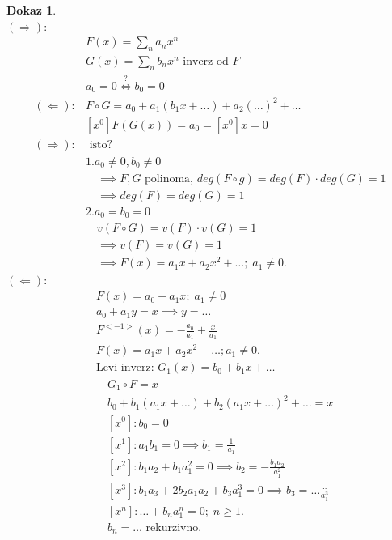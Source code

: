 \documentclass[a4paper, 12pt]{book}
\theoremstyle{definition}
\newtheorem{pro}[counter]{Dokaz}
\theoremstyle{remark}
\begin{document}
\begin{pro} \text{} \\
  $(\Longrightarrow)$:
  \begin{align*}
    &F(x) = \sum_n a_n x^n \\
    &G(x) = \sum_n b_n x^n \text{ inverz od }F \\
    &a_0 = 0 \stackrel{?}{\iff} b_0 = 0 \\
    (\Longleftarrow): &F \circ G = a_0 + a_1(b_1 x + \dots) + a_2(\dots)^2 + \dots \\
    &[x^0] F(G(x)) = a_0 = [x^0] x = 0 \\
    (\Longrightarrow): &\text{ isto?} \\
    &1. a_0 \neq 0, b_0 \neq 0 \\
    &\quad \implies F,G \text{ polinoma, } deg(F \circ g) = deg(F) \cdot deg(G) = 1 \\
    &\quad \implies deg(F) = deg(G) = 1 \\
    &2. a_0 = b_0 = 0 \\
    &\quad v(F \circ G) = v(F) \cdot v(G) = 1 \\
    &\quad \implies v(F) = v(G) = 1 \\
    &\quad \implies F(x) = a_1 x + a_2 x^2 + \dots; \; a_1 \neq 0.
  \end{align*}
  $(\Longleftarrow)$:
  \begin{align*}
    &F(x) = a_0 + a_1 x; \; a_1 \neq 0 \\
    &a_0 + a_1 y = x \implies y = \dots \\
    &F^{<-1>}(x) = -\frac{a_0}{a_1} + \frac{x}{a_1} \\
    &F(x) = a_1 x + a_2 x^2 + \dots; a_1 \neq 0. \\
    &\text{Levi inverz: } G_1(x) = b_0 + b_1 x + \dots \\
    &\quad G_1 \circ F = x \\
    &\quad b_0 + b_1 (a_1 x + \dots) + b_2 (a_1 x + \dots)^2 + \dots = x \\
    &\quad [x^0]: b_0 = 0 \\
    &\quad [x^1]: a_1 b_1 = 0 \implies b_1 = \frac{1}{a_1} \\
    &\quad [x^2]: b_1 a_2 + b_1 a_1^2 = 0 \implies b_2 = -\frac{b_1 a_2}{a_1^2} \\
    &\quad [x^3]: b_1 a_3 + 2 b_2 a_1 a_2 + b_3 a_1^3 = 0 \implies b_3 = \dots \frac{..}{a_1^3} \\
    &\quad [x^n]: \dots + b_n a_1^n = 0; \; n \geq 1. \\
    &\quad b_n = \dots \text{ rekurzivno.} \\

\end{align*}
\end{pro}
\end{document}
